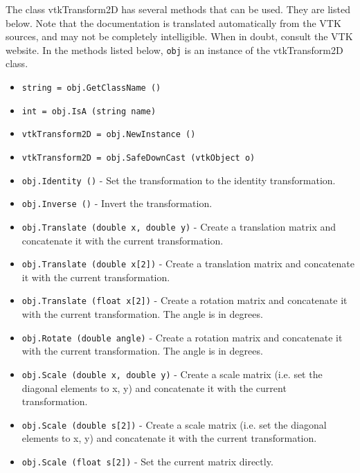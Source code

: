 The class vtkTransform2D has several methods that can be used.
  They are listed below.
Note that the documentation is translated automatically from the VTK sources,
and may not be completely intelligible.  When in doubt, consult the VTK website.
In the methods listed below, \verb|obj| is an instance of the vtkTransform2D class.
\begin{itemize}
\item  \verb|string = obj.GetClassName ()|

\item  \verb|int = obj.IsA (string name)|

\item  \verb|vtkTransform2D = obj.NewInstance ()|

\item  \verb|vtkTransform2D = obj.SafeDownCast (vtkObject o)|

\item  \verb|obj.Identity ()| -  Set the transformation to the identity transformation.

\item  \verb|obj.Inverse ()| -  Invert the transformation.

\item  \verb|obj.Translate (double x, double y)| -  Create a translation matrix and concatenate it with the current
 transformation.

\item  \verb|obj.Translate (double x[2])| -  Create a translation matrix and concatenate it with the current
 transformation.

\item  \verb|obj.Translate (float x[2])| -  Create a rotation matrix and concatenate it with the current
 transformation. The angle is in degrees.

\item  \verb|obj.Rotate (double angle)| -  Create a rotation matrix and concatenate it with the current
 transformation. The angle is in degrees.

\item  \verb|obj.Scale (double x, double y)| -  Create a scale matrix (i.e. set the diagonal elements to x, y)
 and concatenate it with the current transformation.

\item  \verb|obj.Scale (double s[2])| -  Create a scale matrix (i.e. set the diagonal elements to x, y)
 and concatenate it with the current transformation.

\item  \verb|obj.Scale (float s[2])| -  Set the current matrix directly.


\end{itemize}
